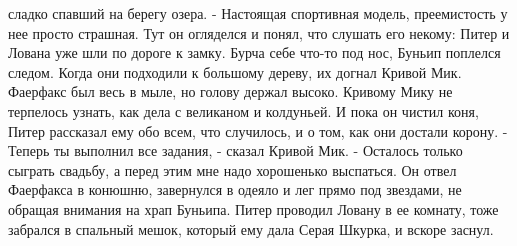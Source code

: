 сладко спавший на берегу озера. - Настоящая спортивная модель, 
преемистость у нее просто страшная.
    Тут он огляделся и понял, что слушать его некому: Питер и Лована 
уже шли по дороге к замку. Бурча себе что-то под нос, Буньип поплелся 
следом.
    Когда они подходили к большому дереву, их догнал Кривой Мик. 
Фаерфакс был весь в мыле, но голову держал высоко.
    Кривому Мику не терпелось узнать, как дела с великаном и 
колдуньей. И пока он чистил коня, Питер рассказал ему обо всем, что 
случилось, и о том, как они достали корону.
    - Теперь ты выполнил все задания, - сказал Кривой Мик. - Осталось 
только сыграть свадьбу, а перед этим мне надо хорошенько выспаться.
    Он отвел Фаерфакса в конюшню, завернулся в одеяло и лег прямо под 
звездами, не обращая внимания на храп Буньипа. Питер проводил Ловану в 
ее комнату, тоже забрался в спальный мешок, который ему дала Серая 
Шкурка, и вскоре заснул.
